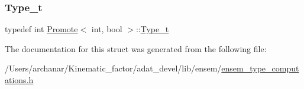 \subsubsection{\texorpdfstring{Type\_t}{Type\_t}\hspace{0.1cm}{\footnotesize\ttfamily [2/2]}}
{\footnotesize\ttfamily typedef int \mbox{\hyperlink{structPromote}{Promote}}$<$ int, bool $>$\+::\mbox{\hyperlink{structPromote_3_01int_00_01bool_01_4_ac7c77d48ab422ab631e128719c53a30b}{Type\+\_\+t}}}



The documentation for this struct was generated from the following file\+:\begin{DoxyCompactItemize}
\item 
/\+Users/archanar/\+Kinematic\+\_\+factor/adat\+\_\+devel/lib/ensem/\mbox{\hyperlink{lib_2ensem_2ensem__type__computations_8h}{ensem\+\_\+type\+\_\+computations.\+h}}\end{DoxyCompactItemize}
